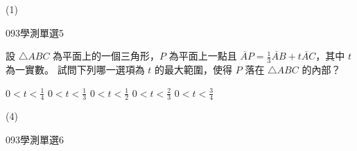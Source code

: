 \begin{QUESTIONS}
\begin{QUESTION}
        \begin{QANS}
            (1)
        \end{QANS}
        \begin{QSOLLIST}
        \end{QSOLLIST}
        \begin{QEMPTYSPACE}
        \end{QEMPTYSPACE}
    \end{QUESTION}
    \begin{QUESTION}
        \begin{ExamInfo}{093}{學測}{單選}{5}
        \end{ExamInfo}
        \begin{ExamAnsRateInfo}{61}{88}{62}{33}
        \end{ExamAnsRateInfo}
        \begin{QBODY}
            設 $\triangle ABC$ 為平面上的一個三角形，$P$ 為平面上一點且 $\lvec{AP}= \frac{1}{3}\lvec{AB}+ t\lvec{AC}$，其中 $t$為一實數。
            試問下列哪一選項為 $t$ 的最大範圍，使得 $P$ 落在 $\triangle ABC$ 的內部？ 
            \begin{QOPS} 
                \QOP $0<t < \frac{1}{4}$ 
                \QOP $0 < t < \frac{1}{3}$ 
                \QOP $0 < t <\frac{1}{2}$ 
                \QOP $0 < t < \frac{2}{3}$ 
                \QOP $0 < t < \frac{3}{4}$
            \end{QOPS}
        \end{QBODY}
        \begin{QFROMS}
        \end{QFROMS}
        \begin{QTAGS}\end{QTAGS}
        \begin{QANS}
            (4)
        \end{QANS}
        \begin{QSOLLIST}
        \end{QSOLLIST}
        \begin{QEMPTYSPACE}
        \end{QEMPTYSPACE}
    \end{QUESTION}
    \begin{QUESTION}
        \begin{ExamInfo}{093}{學測}{單選}{6}
        \end{ExamInfo}
        \begin{ExamAnsRateInfo}{26}{42}{27}{9}
        \end{ExamAnsRateInfo}
        \begin{QBODY}

\end{QBODY}
\end{QUESTION}
\end{QUESTIONS}

